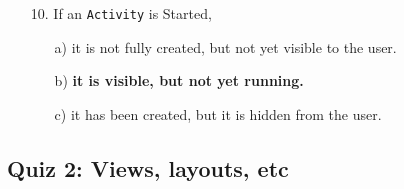 \documentclass[12pt]{article}
\begin{document}
\begin{itemize}
    \item[10.] If an \texttt{Activity} is Started,
    \begin{itemize}
        \item[a)] it is not fully created, but not yet visible to the user.
        \item[b)] \textbf{it is visible, but not yet running.}
        \item[c)] it has been created, but it is hidden from the user.
    \end{itemize}

\end{itemize}

\subsection*{Quiz 2: Views, layouts, etc}
\end{document}
